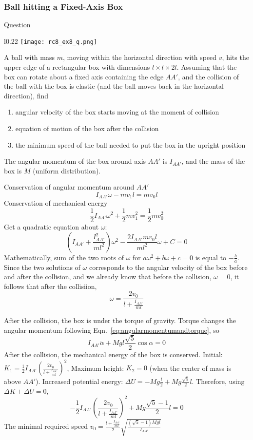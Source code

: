 \begin{frame}
\frametitle{Ball hitting a Fixed-Axis Box}
\begin{block}{Question}
\begin{wrapfigure}{l}{0.22\framewidth}
\texttt{[image: rc8\_ex8\_q.png]}
\end{wrapfigure}
A ball with mass $m$, moving within the horizontal direction with speed $v$, hits the upper edge of a rectangular box with dimensions $l\times l\times 2l$. Assuming that the box can rotate about a \alert{fixed axis} containing the edge $AA'$, and the collision of the ball with the box is \alert{elastic} (and the ball moves back in the horizontal direction), find
\begin{enumerate}
\item \alert{angular velocity} of the box starts moving at the moment of collision
\item \alert{equation of motion} of the box after the collision
\item the \alert{minimum speed} of the ball needed to put the box in the upright position
\end{enumerate}
The angular momentum of the box around axis $AA'$ is $I_{AA'}$, and the mass of the box is $M$ (uniform distribution).
\end{block}
\end{frame}
\begin{frame}
Conservation of angular momentum \alert{around $AA'$}
\[I_{AA'}\omega-mv_1l=mv_0l\]
Conservation of mechanical energy
\[\frac{1}{2}I_{AA'}\omega^2+\frac{1}{2}mv_1^2=\frac{1}{2}mv_0^2\]
Get a quadratic equation about $\omega$:
\[(I_{AA'}+\frac{I_{AA'}^2}{ml^2})\omega^2-\frac{2I_{AA'}mv_0 l}{ml^2}\omega+C=0\]
Mathematically, sum of the two roots of $\omega$ for $a\omega^2+b\omega+c=0$ is equal to $-\frac{b}{a}$. Since the two solutions of $\omega$ corresponds to the angular velocity of the box \alert{before} and \alert{after} the collision, and we already know that before the collision, $\omega=0$, it follows that after the collisiion,
\[\omega=\frac{2v_0}{l+\frac{I_{AA'}}{ml}}\]
\end{frame}
\begin{frame}
After the collision, the box is under the torque of gravity. \alert{Torque} changes the \alert{angular momentum} following Eqn.~\ref{eq:angularmomentumandtorque}, so \[I_{AA'}\ddot\alpha+Mgl\frac{\sqrt 5}{2}\cos\alpha=0\]
After the collision, the mechanical energy of the box is \alert{conserved}.
Initial: $K_1=\frac{1}{2}I_{AA'}\left(\frac{2v_0}{l+\frac{I_{AA'}}{ml}}\right)^2$, Maximum height: $K_2=0$ (when the center of mass is above $AA'$). Increased potential energy: $\Delta U=-Mg\frac{l}{2}+Mg\frac{\sqrt{5}}{2}l$. Therefore, using $\Delta K+\Delta U=0$,
\[-\frac{1}{2}I_{AA'}\left(\frac{2v_0}{l+\frac{I_{AA'}}{ml}}\right)^2+Mg\frac{\sqrt{5}-1}{2}l=0\]
The minimal required speed $v_0=\frac{l+\frac{I_{AA'}}{ml}}{2}\sqrt{\frac{(\sqrt 5-1)Mgl}{I_{AA'}}}$
\end{frame}
